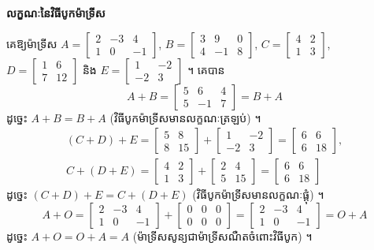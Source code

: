 \textbf{លក្ខណៈនៃវិធីបូកម៉ាទ្រីស}

\begin{example}[ឧទាហរណ៍ ២]
គេឱ្យម៉ាទ្រីស $A = \begin{bmatrix} 2 & -3 & 4\\ 1 & 0 & -1 \end{bmatrix}$, $B = \begin{bmatrix} 3 & 9 & 0\\ 4 & -1 & 8 \end{bmatrix}$, $C = \begin{bmatrix} 4 & 2\\ 1 & 3 \end{bmatrix}$, $D = \begin{bmatrix} 1 & 6\\ 7 & 12 \end{bmatrix}$ និង $E = \begin{bmatrix} 1 & -2\\ -2 & 3 \end{bmatrix}$ ។ គេបាន
\[ A + B = \begin{bmatrix} 5 & 6 & 4\\ 5 & -1 & 7 \end{bmatrix} = B + A \]
ដូច្នេះ $A + B = B + A$ (វិធីបូកម៉ាទ្រីសមានលក្ខណៈត្រឡប់) ។
\[
\begin{gathered}
(C + D) + E = \begin{bmatrix} 5 & 8\\ 8 & 15 \end{bmatrix} + \begin{bmatrix} 1 & -2\\ -2 & 3 \end{bmatrix} = \begin{bmatrix} 6 & 6\\ 6 & 18 \end{bmatrix},\\
C + (D + E) = \begin{bmatrix} 4 & 2\\ 1 & 3 \end{bmatrix} + \begin{bmatrix} 2 & 4\\ 5 & 15 \end{bmatrix} = \begin{bmatrix} 6 & 6\\ 6 & 18 \end{bmatrix}
\end{gathered}
\]
ដូច្នេះ $(C + D) + E = C + (D + E)$ (វិធីបូកម៉ាទ្រីសមានលក្ខណៈផ្តុំ) ។
\[ A + O = \begin{bmatrix} 2 & -3 & 4\\ 1 & 0 & -1 \end{bmatrix} + \begin{bmatrix} 0 & 0 & 0\\ 0 & 0 & 0 \end{bmatrix} = \begin{bmatrix} 2 & -3 & 4\\ 1 & 0 & -1 \end{bmatrix} = O + A \]
ដូច្នេះ $A + O = O + A = A$ (ម៉ាទ្រីសសូន្យជាម៉ាទ្រីសណឺតចំពោះវិធីបូក) ។
\end{example}

